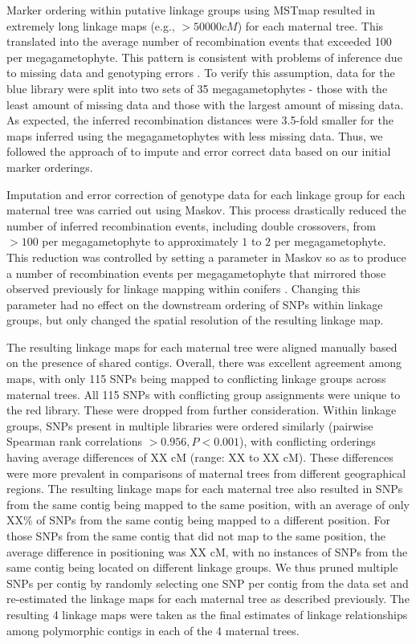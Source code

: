\documentclass[11pt]{article}
\begin{document}
Marker ordering within putative linkage groups using MSTmap resulted in extremely long linkage maps (e.g., $> \num{50000} cM$) for each maternal tree. 
This translated into the average number of recombination events that exceeded \num{100} per megagametophyte. This pattern
is consistent with problems of inference due to missing data and genotyping errors \citep{Ward:2013}. To verify this assumption, data for the
blue library were split into two sets of \num{35} megagametophytes - those with the least amount of missing data and those with the 
largest amount of missing data. As expected, the inferred recombination distances were 3.5-fold smaller for the maps inferred
using the megagametophytes with less missing data. Thus, we followed the approach of \citet{Ward:2013} to impute and error correct
data based on our initial marker orderings.

Imputation and error correction of genotype data for each linkage group for each maternal tree was carried out using Maskov. This
process drastically reduced the number of inferred recombination events, including double crossovers, from $> 100$ per 
megagametophyte to approximately $1$ to $2$ per megagametophyte. This reduction was controlled by setting a parameter
in Maskov so as to produce a number of recombination events per megagametophyte that mirrored those observed previously for
linkage mapping within conifers \citep{Eckert:2009, Martinez-Garcia:2013}. Changing this parameter had no effect on the downstream
ordering of SNPs within linkage groups, but only changed the spatial resolution of the resulting linkage map.

The resulting linkage maps for each maternal tree were aligned manually based on the presence of shared contigs. Overall, there
was excellent agreement among maps, with only 115 SNPs being mapped to conflicting linkage groups across maternal trees. All 115
SNPs with conflicting group assignments were unique to the red library. These were dropped from further consideration. Within linkage groups,
SNPs present in multiple libraries were ordered similarly (pairwise Spearman rank correlations $> 0.956, P < 0.001$), with conflicting orderings 
having average differences of XX cM (range: XX to XX cM). These differences were more prevalent in comparisons of maternal trees from
different geographical regions. The resulting linkage maps for each maternal tree also resulted in SNPs from the same contig being mapped to the same 
position, with an average of only XX\% of SNPs from the same contig being mapped to a different position. For those SNPs from the same contig that
did not map to the same position, the average difference in positioning was XX cM, with no instances of SNPs from the same contig being
located on different linkage groups. We thus pruned multiple SNPs per contig by randomly selecting one SNP per contig from the data set and 
re-estimated the linkage maps for each maternal tree as described previously. The resulting \num{4} linkage maps were taken as the final estimates 
of linkage relationships among polymorphic contigs in each of the \num{4} maternal trees.
\end{document}

